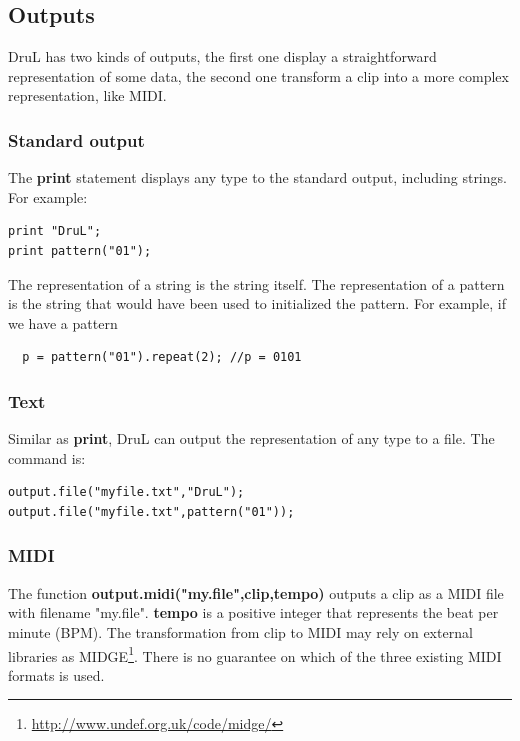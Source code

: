 \documentclass[11pt,twoside]{article}
\begin{document}
\subsection{Outputs}

DruL has two kinds of outputs, the first one display a straightforward
representation of some data, the second one transform a clip into a
more complex representation, like MIDI.

\subsubsection{Standard output}

The \textbf{print} statement displays any type to the standard
output, including strings. For example:
\begin{verbatim}
print "DruL";
print pattern("01");
\end{verbatim}

The representation of a string is the string itself. The representation
of a pattern is the string that would have been used to initialized
the pattern. For example, if we have a pattern
\begin{verbatim}
  p = pattern("01").repeat(2); //p = 0101
\end{verbatim}

\subsubsection{Text}

Similar as \textbf{print}, DruL can output the representation of any type 
to a file. The command is:
\begin{verbatim}
output.file("myfile.txt","DruL");
output.file("myfile.txt",pattern("01"));
\end{verbatim}

\subsubsection{MIDI}

The function \textbf{output.midi("my.file",clip,tempo)} outputs a clip as a MIDI
file with filename "my.file". \textbf{tempo} is a positive integer that
represents the beat per minute (BPM). 
The transformation from clip to MIDI may rely
on external libraries as MIDGE\footnote{\url{http://www.undef.org.uk/code/midge/}}. There is no guarantee on which of the three existing MIDI formats is used.
\end{document}
